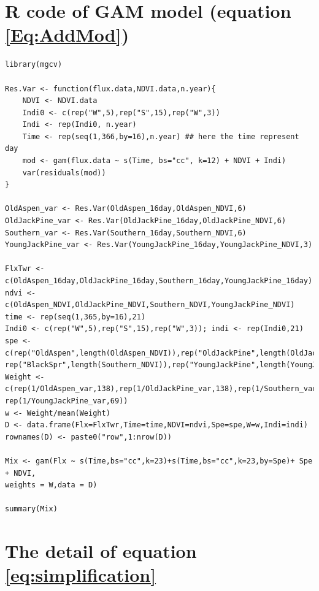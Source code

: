 \documentclass{article}
\begin{document}
\begin{appendices}
\section{R code of GAM model (equation \ref{Eq:AddMod})}\label{sec:gamcode}

\begin{verbatim}
library(mgcv)

Res.Var <- function(flux.data,NDVI.data,n.year){
	NDVI <- NDVI.data
	Indi0 <- c(rep("W",5),rep("S",15),rep("W",3)) 
	Indi <- rep(Indi0, n.year)
	Time <- rep(seq(1,366,by=16),n.year) ## here the time represent day	
	mod <- gam(flux.data ~ s(Time, bs="cc", k=12) + NDVI + Indi)
	var(residuals(mod))
}

OldAspen_var <- Res.Var(OldAspen_16day,OldAspen_NDVI,6)
OldJackPine_var <- Res.Var(OldJackPine_16day,OldJackPine_NDVI,6)
Southern_var <- Res.Var(Southern_16day,Southern_NDVI,6)
YoungJackPine_var <- Res.Var(YoungJackPine_16day,YoungJackPine_NDVI,3)

FlxTwr <- c(OldAspen_16day,OldJackPine_16day,Southern_16day,YoungJackPine_16day)
ndvi <- c(OldAspen_NDVI,OldJackPine_NDVI,Southern_NDVI,YoungJackPine_NDVI)
time <- rep(seq(1,365,by=16),21)
Indi0 <- c(rep("W",5),rep("S",15),rep("W",3)); indi <- rep(Indi0,21)
spe <-c(rep("OldAspen",length(OldAspen_NDVI)),rep("OldJackPine",length(OldJackPine_NDVI)),
rep("BlackSpr",length(Southern_NDVI)),rep("YoungJackPine",length(YoungJackPine_NDVI)))
Weight <- c(rep(1/OldAspen_var,138),rep(1/OldJackPine_var,138),rep(1/Southern_var,138),
rep(1/YoungJackPine_var,69))
w <- Weight/mean(Weight)
D <- data.frame(Flx=FlxTwr,Time=time,NDVI=ndvi,Spe=spe,W=w,Indi=indi)
rownames(D) <- paste0("row",1:nrow(D)) 

Mix <- gam(Flx ~ s(Time,bs="cc",k=23)+s(Time,bs="cc",k=23,by=Spe)+ Spe + NDVI, 
weights = W,data = D)

summary(Mix)
\end{verbatim}

\newpage

\section{The detail of equation \ref{eq:simplification}}\label{sec:krig}


\end{appendices}
\end{document}
